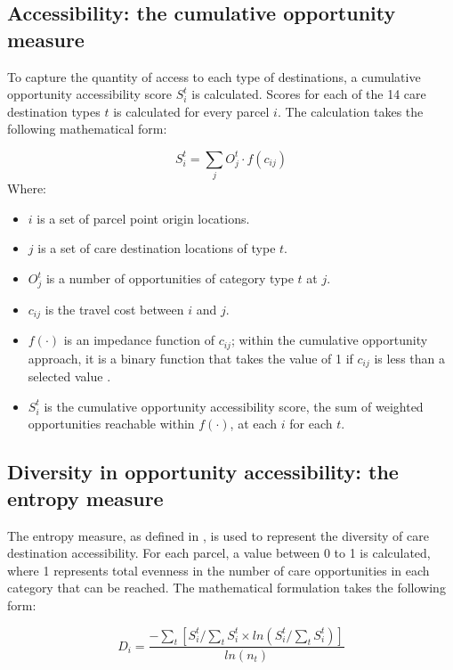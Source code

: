 \documentclass[
  authoryear,
  preprint,
  3p]{elsarticle}
\providecommand{\tightlist}{%
  \setlength{\itemsep}{0pt}\setlength{\parskip}{0pt}}\usepackage{longtable,booktabs,array}
\def\tightlist{}
\begin{document}
\subsection{Accessibility: the cumulative opportunity
measure}\label{accessibility-the-cumulative-opportunity-measure}

To capture the quantity of access to each type of destinations, a
cumulative opportunity accessibility score \(S^t_i\) is calculated.
Scores for each of the 14 care destination types \(t\) is calculated for
every parcel \(i\). The calculation takes the following mathematical
form:

\[
S^t_i=\sum_{j}O_j^{t}\cdot f(c_{ij})
\] \noindent Where:

\begin{itemize}
\tightlist
\item
  \(i\) is a set of parcel point origin locations.
\item
  \(j\) is a set of care destination locations of type \(t\).
\item
  \(O^t_j\) is a number of opportunities of category type \(t\) at
  \(j\).
\item
  \(c_{ij}\) is the travel cost between \(i\) and \(j\).
\item
  \(f(\cdot)\) is an impedance function of \(c_{ij}\); within the
  cumulative opportunity approach, it is a binary function that takes
  the value of 1 if \(c_{ij}\) is less than a selected value
  \citep{handyMeasuringAccessibilityExploration1997}.
\item
  \(S_{i}^t\) is the cumulative opportunity accessibility score, the sum
  of weighted opportunities reachable within \(f(\cdot)\), at each \(i\)
  for each \(t\).
\end{itemize}

\subsection{Diversity in opportunity accessibility: the entropy
measure}\label{diversity-in-opportunity-accessibility-the-entropy-measure}

The entropy measure, as defined in \citet{cerveroTravelDemand3Ds1997},
is used to represent the diversity of care destination accessibility.
For each parcel, a value between 0 to 1 is calculated, where 1
represents total evenness in the number of care opportunities in each
category that can be reached. The mathematical formulation takes the
following form:

\[
D_{i} = \frac{-\sum_{t} [S_i^{t} / \sum_{t}S^{t}_{i} \times ln(S_i^{t} / \sum_{t}S^{t}_{i} )]}{ln(n_t)}
\]
\end{document}
